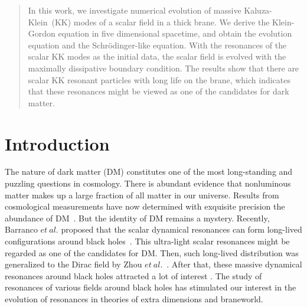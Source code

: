 \begin{abstract}
In this work, we investigate numerical evolution of massive Kaluza-Klein~(KK) modes of a scalar field in a thick brane. We derive the Klein-Gordon equation in five dimensional spacetime, and obtain the evolution equation and the Schr\"odinger-like equation. With the resonances of the scalar KK modes as the initial data, the scalar field is evolved with the  maximally dissipative boundary condition. The results show that there are scalar KK resonant particles with long life on the brane, which indicates that these resonances might be viewed as one of the candidates for dark matter.
\end{abstract}


\section{Introduction}
\label{Introduction}
The nature of dark matter (DM) constitutes one of the most long-standing and puzzling questions in cosmology. There is abundant evidence that nonluminous matter makes up a large fraction of all matter in our universe. Results from cosmological measurements have now determined with exquisite precision the abundance of DM~\cite{Planck:2018vyg}. But the identity of DM remains a mystery. Recently, Barranco $et~al.$ proposed that the scalar dynamical resonances can form long-lived configurations around black holes~\cite{Barranco:2011eyw,Barranco:2012qs,Barranco:2013rua}. This ultra-light scalar resonances might be regarded as one of the candidates for DM. Then, such long-lived distribution was generalized to the Dirac field by Zhou $et~al.$~\cite{Zhou:2013dra}. After that, these massive dynamical resonances around black holes attracted a lot of interest \cite{Gossel:2013cka,Decanini:2014bwa,Sampaio:2014swa,Degollado:2014vsa,
Sanchis-Gual:2014ewa,Sanchis-Gual:2015sxa,Sanchis-Gual:2016jst,Barranco:2017aes,Huang:2017nho,Sporea:2019iwk}. The study of resonances of various fields around black holes has stimulated our interest in the evolution of resonances in theories of extra dimensions and braneworld.

